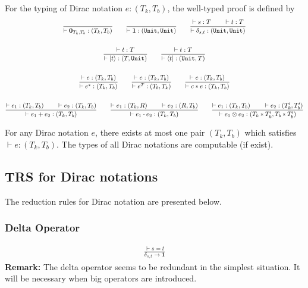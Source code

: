 \begin{definition} 
  For the typing of Dirac notation $e : (T_k, T_b)$, the well-typed proof is defined by
  \begin{gather*}
    \frac{}{\vdash \mathbf{0}_{T_k, T_b} : (T_k, T_b)}
    \qquad
    \frac{}{\vdash \mathbf{1} : (\texttt{Unit}, \texttt{Unit})}
    \qquad
    \frac{\vdash s : T \qquad \vdash t : T}{\vdash \delta_{s, t} : (\texttt{Unit}, \texttt{Unit})}\\
    \ \\
    \frac{\vdash t : T}{\vdash |t\rangle : (T, \texttt{Unit})}
    \qquad 
    \frac{\vdash t : T}{\vdash \langle t| : (\texttt{Unit}, T)}\\
    \ \\
    \frac{\vdash e : (T_k, T_b)}{\vdash e^* : (T_k, T_b)}
    \qquad
    \frac{\vdash e : (T_k, T_b)}{\vdash e^T : (T_b, T_k)}
    \qquad
    \frac{\vdash e : (T_k, T_b)}{\vdash c * e : (T_k, T_b)}\\
    \ \\
    \frac{\vdash e_1 : (T_k, T_b)\qquad \vdash e_2 : (T_k, T_b)}{\vdash e_1 + e_2 : (T_k, T_b)}
    \qquad 
    \frac{\vdash e_1 : (T_k, R)\qquad \vdash e_2 : (R, T_b)}{\vdash e_1 \cdot e_2 : (T_k, T_b)}
    \qquad
    \frac{\vdash e_1 : (T_k, T_b)\qquad \vdash e_2 : (T_k', T_b')}{\vdash e_1 \otimes e_2 : (T_k * T_k', T_b * T_b')}
  \end{gather*}
\end{definition}


\begin{claim}
  For any Dirac notation $e$, there exists at most one pair $(T_k, T_b)$ which satisfies $\vdash e : (T_k, T_b)$. The types of all Dirac notations are computable (if exist).
\end{claim}


\subsection{TRS for Dirac notations}
The reduction rules for Dirac notation are presented below.


\subsubsection*{Delta Operator}
\begin{align*}
  \frac{\vdash s = t}{\delta_{s, t} \to \mathbf{1}}
\end{align*}
\textbf{Remark: } The delta operator seems to be redundant in the simplest situation. It will be necessary when big operators are introduced.


